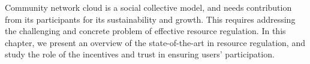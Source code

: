 


Community network cloud is a social collective model, and needs contribution from its 
participants for its sustainability and growth. 
This requires addressing the challenging and concrete problem of effective resource regulation. 
In this chapter, we present an overview of the state-of-the-art in resource regulation,
and study the role of the incentives and trust in ensuring users' participation.
